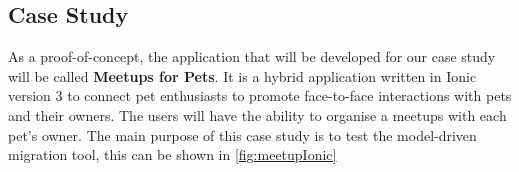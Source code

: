 \documentclass[conference]{IEEEtran}
\begin{document}
\subsection{Case Study}
As a proof-of-concept, the application that will be developed for our case study will be called \textbf{Meetups for Pets}. It is a hybrid application written 
in Ionic version 3 to connect pet enthusiasts to promote face-to-face interactions with pets and their owners. The users will have the ability to organise a 
meetups with each pet’s owner. The main purpose of this case study is to test the model-driven migration tool, this can be shown in \ref{fig:meetupIonic}
\begin{figure}%
    \centering

\end{figure}
\end{document}
